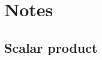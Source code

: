 \documentclass[
a4paper,%
10pt,%
titlepage,%
twoside%
]{article}
\begin{document}


\section{Notes}

\subsection{Scalar product}
\end{document}
